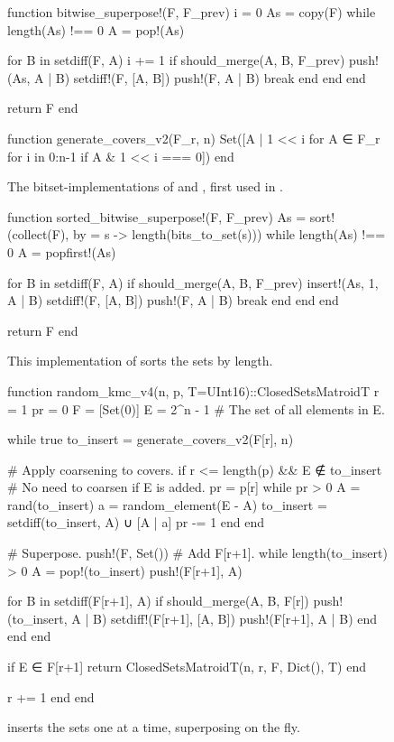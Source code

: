 \begin{figure}
  \begin{jllisting}
function bitwise_superpose!(F, F_prev)
  i = 0
  As = copy(F)
  while length(As) !== 0
    A = pop!(As)

    for B in setdiff(F, A)
      i += 1
      if should_merge(A, B, F_prev)
        push!(As, A | B)
        setdiff!(F, [A, B])
        push!(F, A | B)
        break
      end
    end
  end

  return F
end

function generate_covers_v2(F_r, n)
  Set([A | 1 << i for A ∈ F_r for i in 0:n-1 if A & 1 << i === 0])
end
  \end{jllisting}
  \caption{The bitset-implementations of  and , first used in .}
  \label{code:rkmc_v2}
\end{figure}

\begin{figure}
  \begin{jllisting}
function sorted_bitwise_superpose!(F, F_prev)
  As = sort!(collect(F), by = s -> length(bits_to_set(s)))
  while length(As) !== 0
    A = popfirst!(As)

    for B in setdiff(F, A)
      if should_merge(A, B, F_prev)
        insert!(As, 1, A | B)
        setdiff!(F, [A, B])
        push!(F, A | B)
        break
      end
    end
  end

  return F
end
  \end{jllisting}
  \caption{This implementation of  sorts the sets by length.}
  \label{code:rkmc_v3}
\end{figure}


\begin{figure}
  \begin{jllisting}
function random_kmc_v4(n, p, T=UInt16)::ClosedSetsMatroid{T}
  r = 1
  pr = 0
  F = [Set(0)]
  E = 2^n - 1 # The set of all elements in E.

  while true
    to_insert = generate_covers_v2(F[r], n)

    # Apply coarsening to covers.
    if r <= length(p) && E ∉ to_insert # No need to coarsen if E is added.
      pr = p[r]
      while pr > 0
        A = rand(to_insert)
        a = random_element(E - A)
        to_insert = setdiff(to_insert, A) ∪ [A | a]
        pr -= 1
      end
    end

    # Superpose.
    push!(F, Set()) # Add F[r+1].
    while length(to_insert) > 0
      A = pop!(to_insert)
      push!(F[r+1], A)

      for B in setdiff(F[r+1], A)
        if should_merge(A, B, F[r])
          push!(to_insert, A | B)
          setdiff!(F[r+1], [A, B])
          push!(F[r+1], A | B)
        end
      end
    end

    if E ∈ F[r+1]
      return ClosedSetsMatroid{T}(n, r, F, Dict(), T)
    end

    r += 1
  end
end
  \end{jllisting}
  \caption{ inserts the sets one at a time, superposing on the fly.}
  \label{code:rkmc_v4}
\end{figure}

